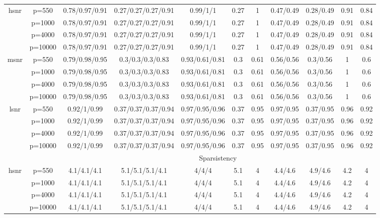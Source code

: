 \begin{table}[ht]
{\begin{tabular}{|c|c|ccccccccc|}
\midrule\multirow{4}[2]{*}{hsnr} & p=550 & 0.78/0.97/0.91 & 0.27/0.27/0.27/0.91 & 0.99/1/1 & 0.27 & 1 & 0.47/0.49 & 0.28/0.49 & 0.91 & 0.84 \\ 
   & p=1000 & 0.78/0.97/0.91 & 0.27/0.27/0.27/0.91 & 0.99/1/1 & 0.27 & 1 & 0.47/0.49 & 0.28/0.49 & 0.91 & 0.84 \\ 
   & p=4000 & 0.78/0.97/0.91 & 0.27/0.27/0.27/0.91 & 0.99/1/1 & 0.27 & 1 & 0.47/0.49 & 0.28/0.49 & 0.91 & 0.84 \\ 
   & p=10000 & 0.78/0.97/0.91 & 0.27/0.27/0.27/0.91 & 0.99/1/1 & 0.27 & 1 & 0.47/0.49 & 0.28/0.49 & 0.91 & 0.84 \\ 
  \midrule\multirow{4}[2]{*}{msnr} & p=550 & 0.79/0.98/0.95 & 0.3/0.3/0.3/0.83 & 0.93/0.61/0.81 & 0.3 & 0.61 & 0.56/0.56 & 0.3/0.56 & 1 & 0.6 \\ 
   & p=1000 & 0.79/0.98/0.95 & 0.3/0.3/0.3/0.83 & 0.93/0.61/0.81 & 0.3 & 0.61 & 0.56/0.56 & 0.3/0.56 & 1 & 0.6 \\ 
   & p=4000 & 0.79/0.98/0.95 & 0.3/0.3/0.3/0.83 & 0.93/0.61/0.81 & 0.3 & 0.61 & 0.56/0.56 & 0.3/0.56 & 1 & 0.6 \\ 
   & p=10000 & 0.79/0.98/0.95 & 0.3/0.3/0.3/0.83 & 0.93/0.61/0.81 & 0.3 & 0.61 & 0.56/0.56 & 0.3/0.56 & 1 & 0.6 \\ 
  \midrule\multirow{4}[2]{*}{lsnr} & p=550 & 0.92/1/0.99 & 0.37/0.37/0.37/0.94 & 0.97/0.95/0.96 & 0.37 & 0.95 & 0.97/0.95 & 0.37/0.95 & 0.96 & 0.92 \\ 
   & p=1000 & 0.92/1/0.99 & 0.37/0.37/0.37/0.94 & 0.97/0.95/0.96 & 0.37 & 0.95 & 0.97/0.95 & 0.37/0.95 & 0.96 & 0.92 \\ 
   & p=4000 & 0.92/1/0.99 & 0.37/0.37/0.37/0.94 & 0.97/0.95/0.96 & 0.37 & 0.95 & 0.97/0.95 & 0.37/0.95 & 0.96 & 0.92 \\ 
   & p=10000 & 0.92/1/0.99 & 0.37/0.37/0.37/0.94 & 0.97/0.95/0.96 & 0.37 & 0.95 & 0.97/0.95 & 0.37/0.95 & 0.96 & 0.92 \\ 
   \midrule 
 \multicolumn{1}{|c}{} &       & \multicolumn{9}{c|}{Sparsistency} \\
\midrule\multirow{4}[2]{*}{hsnr} & p=550 & 4.1/4.1/4.1 & 5.1/5.1/5.1/4.1 & 4/4/4 & 5.1 & 4 & 4.4/4.6 & 4.9/4.6 & 4.2 & 4 \\ 
   & p=1000 & 4.1/4.1/4.1 & 5.1/5.1/5.1/4.1 & 4/4/4 & 5.1 & 4 & 4.4/4.6 & 4.9/4.6 & 4.2 & 4 \\ 
   & p=4000 & 4.1/4.1/4.1 & 5.1/5.1/5.1/4.1 & 4/4/4 & 5.1 & 4 & 4.4/4.6 & 4.9/4.6 & 4.2 & 4 \\ 
   & p=10000 & 4.1/4.1/4.1 & 5.1/5.1/5.1/4.1 & 4/4/4 & 5.1 & 4 & 4.4/4.6 & 4.9/4.6 & 4.2 & 4 \\ 

\end{tabular}}
\end{table}
